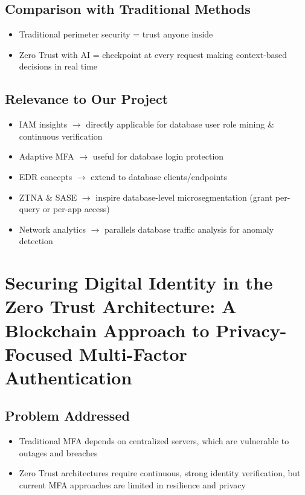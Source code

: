 \subsection{Comparison with Traditional Methods}

\begin{itemize}
    \item Traditional perimeter security = trust anyone inside
    \item Zero Trust with AI = checkpoint at every request making context-based decisions in real time
\end{itemize}

\subsection{Relevance to Our Project}

\begin{itemize}
    \item IAM insights $\rightarrow$ directly applicable for database user role mining \& continuous verification
    \item Adaptive MFA $\rightarrow$ useful for database login protection
    \item EDR concepts $\rightarrow$ extend to database clients/endpoints
    \item ZTNA \& SASE $\rightarrow$ inspire database-level microsegmentation (grant per-query or per-app access)
    \item Network analytics $\rightarrow$ parallels database traffic analysis for anomaly detection
\end{itemize}

\section{Securing Digital Identity in the Zero Trust Architecture: A Blockchain Approach to Privacy-Focused Multi-Factor Authentication}

\subsection{Problem Addressed}

\begin{itemize}
    \item Traditional MFA depends on centralized servers, which are vulnerable to outages and breaches
    \item Zero Trust architectures require continuous, strong identity verification, but current MFA approaches are limited in resilience and privacy
\end{itemize}

